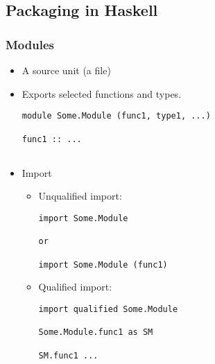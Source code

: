 \subsection{Packaging in Haskell}

\begin{frame}[fragile]
  \frametitle{Modules}
  \begin{itemize}
    \item A source unit (a file)
    \item Exports selected functions and types.
\begin{lstlisting}
module Some.Module (func1, type1, ...)

func1 :: ...
 
\end{lstlisting}
	 \item Import
	   \begin{itemize}
	     \item Unqualified import:
\begin{lstlisting}
import Some.Module

or

import Some.Module (func1) 
\end{lstlisting}
         \item Qualified import: 

\begin{lstlisting}
import qualified Some.Module

Some.Module.func1 as SM

SM.func1 ...
\end{lstlisting}

      \end{itemize}
  \end{itemize}
  
\end{frame}

